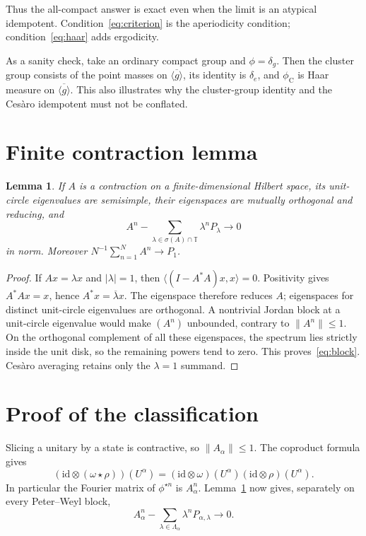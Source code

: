 \documentclass[11pt]{article}
\newtheorem{lemma}{Lemma}
\theoremstyle{remark}
\newcommand{\T}{\mathbb T}
\newcommand{\id}{\mathrm{id}}
\begin{document}
Thus the all-compact answer is exact even when the limit is an atypical
idempotent.  Condition~\eqref{eq:criterion} is the aperiodicity condition;
condition~\eqref{eq:haar} adds ergodicity.

As a sanity check, take an ordinary compact group and $\phi=\delta_g$.
Then the cluster group consists of the point masses on
$\overline{\langle g\rangle}$, its identity is $\delta_e$, and
$\phi_{\mathrm C}$ is Haar measure on $\overline{\langle g\rangle}$.  This
also illustrates why the cluster-group identity and the Ces\`aro idempotent
must not be conflated.

\section{Finite contraction lemma}

\begin{lemma}\label{lem:contraction}
If $A$ is a contraction on a finite-dimensional Hilbert space, its
unit-circle eigenvalues are semisimple, their eigenspaces are mutually
orthogonal and reducing, and
\begin{equation}\label{eq:block}
 A^n-\sum_{\lambda\in\sigma(A)\cap\T}\lambda^nP_\lambda
 \longrightarrow0
\end{equation}
in norm.  Moreover $N^{-1}\sum_{n=1}^NA^n\to P_1$.
\end{lemma}

\begin{proof}
If $Ax=\lambda x$ and $|\lambda|=1$, then
$\langle(I-A^*A)x,x\rangle=0$.  Positivity gives $A^*Ax=x$, hence
$A^*x=\overline\lambda x$.  The eigenspace therefore reduces $A$; eigenspaces
for distinct unit-circle eigenvalues are orthogonal.  A nontrivial Jordan
block at a unit-circle eigenvalue would make $(A^n)$ unbounded, contrary to
$\|A^n\|\leq1$.  On the orthogonal complement of all these eigenspaces, the
spectrum lies strictly inside the unit disk, so the remaining powers tend to
zero.  This proves~\eqref{eq:block}.  Ces\`aro averaging retains only the
$\lambda=1$ summand.
\end{proof}

\section{Proof of the classification}

Slicing a unitary by a state is contractive, so $\|A_\alpha\|\leq1$.
The coproduct formula gives
\begin{equation}\label{eq:mult}
 (\id\otimes(\omega\star\rho))(U^\alpha)
 = (\id\otimes\omega)(U^\alpha)
   (\id\otimes\rho)(U^\alpha).
\end{equation}
In particular the Fourier matrix of $\phi^{\star n}$ is $A_\alpha^n$.
Lemma~\ref{lem:contraction} now gives, separately on every Peter--Weyl block,
\begin{equation}\label{eq:asymp}
 A_\alpha^n-
 \sum_{\lambda\in\Lambda_\alpha}
 \lambda^nP_{\alpha,\lambda}\longrightarrow0.
\end{equation}
\end{document}

